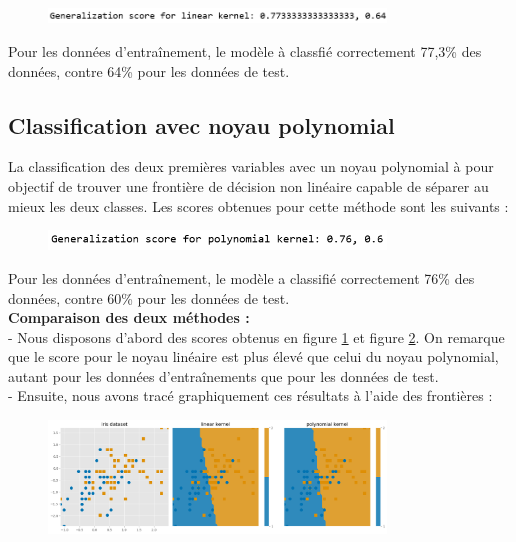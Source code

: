 \documentclass[a4paper,12pt]{article}
\begin{document}
\begin{figure}[h!]
    \centering
    \includegraphics[width=0.8\textwidth]{Images/linear_score.png}
    \caption{}
    \label{fig:linear}
\end{figure}

Pour les données d'entraînement, le modèle à classfié correctement 77,3\% des données, contre 64\% pour les données de test. 


\subsection{Classification avec noyau polynomial}

La classification des deux premières variables avec un noyau polynomial à pour objectif de trouver une frontière de décision non linéaire capable de séparer au mieux les deux classes. 
Les scores obtenues pour cette méthode sont les suivants :

\begin{figure}[h!]
    \centering
    \includegraphics[width=0.8\textwidth]{Images/poly_score.png}
    \caption{}
    \label{fig:poly}
\end{figure}

Pour les données d'entraînement, le modèle a classifié correctement 76\% des données, contre 60\% pour les données de test. \\

\textbf{Comparaison des deux méthodes :}\\[0.5cm]
- Nous disposons d'abord des scores obtenus en figure \ref{fig:linear} et figure \ref{fig:poly}.
On remarque que le score pour le noyau linéaire est plus élevé que celui du noyau polynomial, autant pour les données d'entraînements que pour les données de test.\\

- Ensuite, nous avons tracé graphiquement ces résultats à l'aide des frontières : 
\begin{figure}[h!]
    \centering
    \includegraphics[width=0.8\textwidth]{Images/linear_vs_poly.png}
    \caption{}
\end{figure}
\end{document}

